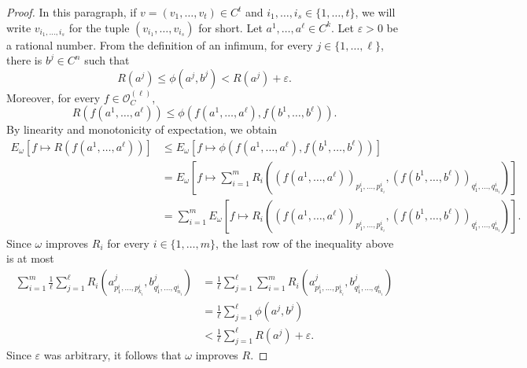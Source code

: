 \documentclass[nonacm]{acmart}
\begin{document}
\begin{proof}
In this paragraph, if $v=(v_1, \dots, v_t) \in C^t$ and $i_1,\dots, i_s \in \{1, \dots, t\}$, we will write $v_{i_1, \dots, i_s}$ for the tuple $(v_{i_1}, \dots, v_{i_s})$ for short. Let $a^1, \dots, a^{\ell} \in C^k$. Let $\varepsilon > 0$ be a rational number. From the definition of an infimum, for every $j \in \{1, \dots, \ell\}$, there is $b^j\in C^n$ such that
\[ R(a^j) \leq \phi(a^j, b^j) < R(a^j)+ \varepsilon.\] Moreover, for every $f \in {\mathscr O}_C^{(\ell)}$, 
\[ R(f(a^1, \dots, a^{\ell})) \leq \phi(f(a^1, \dots, a^{\ell}), f(b^1, \dots, b^{\ell})).\]
By linearity and monotonicity of expectation, we obtain
\begin{align*} 
E_\omega[f \mapsto R(f(a^1,\dots,a^{\ell}))] 
&\leq E_\omega[f \mapsto \phi(f(a^1,\dots,a^{\ell}), f(b^1, \dots, b^{\ell}))]  \\
&= E_\omega[f \mapsto \sum_{i=1}^{m} R_i((f(a^1,\dots,a^{\ell}))_{p_1^i, \dots, p_{k_i}^i}, (f(b^1, \dots, b^{\ell}))_{q_1^i, \dots, q_{n_i}^i})]\\
&= \sum_{i=1}^{m} E_\omega[f \mapsto R_i((f(a^1,\dots,a^{\ell}))_{p_1^i, \dots, p_{k_i}^i}, (f(b^1, \dots, b^{\ell}))_{q_1^i, \dots, q_{n_i}^i})].  
\end{align*}
Since $\omega$ improves $R_i$ for every $i\in \{1, \dots, m\}$, the last row of the inequality above is at most
\begin{align*}
\sum_{i=1}^{m} \frac{1}{\ell} \sum_{j=1}^{\ell} 
R_i(a^j_{p_1^i, \dots, p_{k_i}^i}, b^j_{q_1^i, \dots, q_{n_i}^i})
&= \frac{1}{\ell} \sum_{j=1}^{\ell} \sum_{i=1}^{m}
R_i(a^j_{p_1^i, \dots, p_{k_i}^i}, b^j_{q_1^i, \dots, q_{n_i}^i}) \\
&= \frac{1}{\ell} \sum_{j=1}^{\ell} \phi(a^j, b^j) \\
&< \frac{1}{\ell} \sum_{j=1}^{\ell} R(a^j) + \varepsilon. 
\end{align*}
Since $\varepsilon$ was arbitrary, it follows that $\omega$ improves $R$.


\end{proof}
\end{document}
